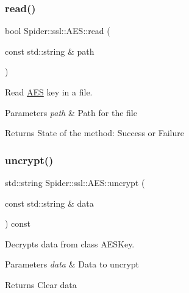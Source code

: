 \subsubsection{\texorpdfstring{read()}{read()}}
{\footnotesize\ttfamily bool Spider\+::ssl\+::\+A\+E\+S\+::read (\begin{DoxyParamCaption}\item[{const std\+::string \&}]{path }\end{DoxyParamCaption})}



Read \hyperlink{class_spider_1_1ssl_1_1_a_e_s}{A\+ES} key in a file. 


\begin{DoxyParams}{Parameters}
{\em path} & Path for the file \\
\hline
\end{DoxyParams}
\begin{DoxyReturn}{Returns}
State of the method\+: Success or Failure 
\end{DoxyReturn}
\mbox{\label{class_spider_1_1ssl_1_1_a_e_s_a187c229df6c9e59b44c6148f5eac6177}} 
\subsubsection{\texorpdfstring{uncrypt()}{uncrypt()}}
{\footnotesize\ttfamily std\+::string Spider\+::ssl\+::\+A\+E\+S\+::uncrypt (\begin{DoxyParamCaption}\item[{const std\+::string \&}]{data }\end{DoxyParamCaption}) const}



Decrypts data from class A\+E\+S\+Key. 


\begin{DoxyParams}{Parameters}
{\em data} & Data to uncrypt \\
\hline
\end{DoxyParams}
\begin{DoxyReturn}{Returns}
Clear data 
\end{DoxyReturn}
\mbox{\label{class_spider_1_1ssl_1_1_a_e_s_ac4c9691e1fd1c250343ebe8206f26026}} 
